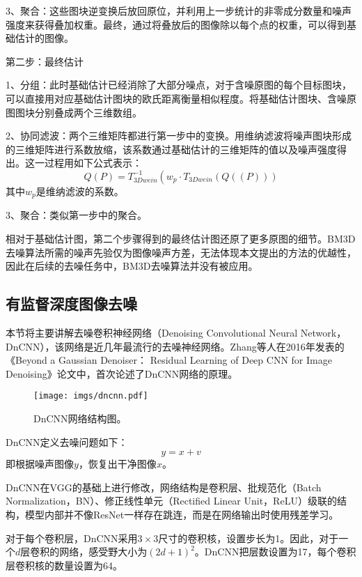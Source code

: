 3、聚合：这些图块逆变换后放回原位，并利用上一步统计的非零成分数量和噪声强度来获得叠加权重。最终，通过将叠放后的图像除以每个点的权重，可以得到基础估计的图像。

第二步：最终估计

1、分组：此时基础估计已经消除了大部分噪点，对于含噪原图的每个目标图块，可以直接用对应基础估计图块的欧氏距离衡量相似程度。将基础估计图块、含噪原图图块分别叠成两个三维数组。

2、协同滤波：两个三维矩阵都进行第一步中的变换。用维纳滤波将噪声图块形成的三维矩阵进行系数放缩，该系数通过基础估计的三维矩阵的值以及噪声强度得出。这一过程用如下公式表示：
\begin{equation}
	Q(P)=T_{3 D wein }^{-1}\left(w_p \cdot T_{3Dwein}(Q((P)))\right.
\end{equation}
其中$w_p$是维纳滤波的系数。

3、聚合：类似第一步中的聚合。

相对于基础估计图，第二个步骤得到的最终估计图还原了更多原图的细节。BM3D去噪算法所需的噪声先验仅为图像噪声方差，无法体现本文提出的方法的优越性，因此在后续的去噪任务中，BM3D去噪算法并没有被应用。

\subsection{有监督深度图像去噪}

本节将主要讲解去噪卷积神经网络（Denoising Convolutional Neural Network，DnCNN），该网络是近几年最流行的去噪神经网络。Zhang等人在2016年发表的《Beyond a Gaussian Denoiser： Residual Learning of Deep CNN for Image Denoising》\cite{dncnn}论文中，首次论述了DnCNN网络的原理。

\begin{figure}[h]
	\centering
	\texttt{[image: imgs/dncnn.pdf]}
	\caption{DnCNN网络结构图。\cite{dncnn}}
	\label{fig:dncnn}
\end{figure}

DnCNN定义去噪问题如下：
\begin{equation}
	y=x+v
\end{equation}
即根据噪声图像$y$，恢复出干净图像$x$。

DnCNN在VGG\cite{vgg}的基础上进行修改，网络结构是卷积层、批规范化（Batch Normalization，BN）、修正线性单元（Rectified Linear Unit，ReLU）级联的结构，模型内部并不像ResNet\cite{resnet}一样存在跳连，而是在网络输出时使用残差学习。

对于每个卷积层，DnCNN采用$3\times 3$尺寸的卷积核，设置步长为1。因此，对于一个$d$层卷积的网络，感受野大小为$(2d+1)^2$。DnCNN把层数设置为17，每个卷积层卷积核的数量设置为64。


